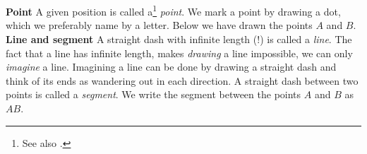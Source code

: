 




\newpage
\section{\omgr}
\textbf{Point}\os
A given position is called a\footnote{See also .} \textit{point}. We mark a point by drawing a dot, which we preferably name by a letter. Below we have drawn the points $ A $ and $ B $.
\textbf{Line and segment}\os
A straight dash with infinite length (!) is called a \textit{line}. The fact that a line has infinite length, makes \textsl{drawing} a line impossible, we can only \textsl{imagine} a line. Imagining a line can be done by drawing a straight dash and think of its ends as wandering out in each direction.
A straight dash between two points is called a \textit{segment}.
We write the segment between the points $ A $ and $ B $ as $ AB $.  \vsk
{}

